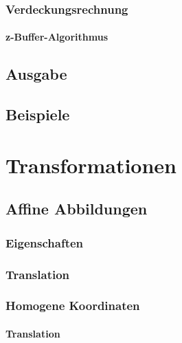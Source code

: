 \documentclass[a4paper, 11pt, accentcolor = tud3b]{tudreport}
\begin{document}
			\subsection{Verdeckungsrechnung} %

				\subsubsection{z-Buffer-Algorithmus} %

		\section{Ausgabe} %

		\section{Beispiele} %

	\chapter{Transformationen} %

		\section{Affine Abbildungen} %

			\subsection{Eigenschaften} %

			\subsection{Translation} %

			\subsection{Homogene Koordinaten} %

				\subsubsection{Translation} %
\end{document}
